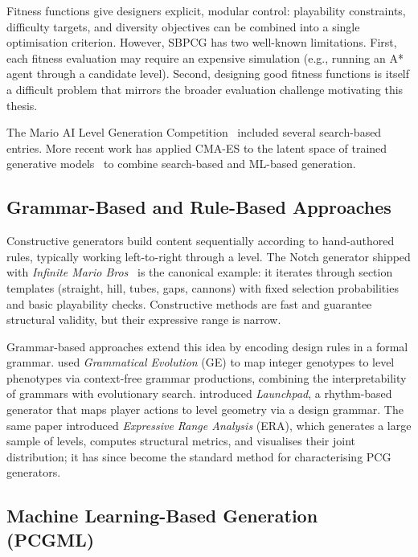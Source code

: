 \documentclass[shortabstract, mgr, english]{iithesis}
\begin{document}
Fitness functions give designers explicit, modular
control: playability constraints, difficulty targets,
and diversity objectives can be combined into a single optimisation criterion. However, SBPCG has
two well-known limitations. First, each fitness evaluation may require an
expensive simulation (e.g., running an A* agent through a candidate level).
Second, designing good fitness functions is itself a difficult problem that
mirrors the broader evaluation challenge motivating this thesis.

The Mario AI Level Generation Competition~\citep{shaker2011mario} included
several search-based entries. More recent work has applied CMA-ES to the latent
space of trained generative models~\citep{volz2018evolving} to combine
search-based and ML-based generation.

\subsection{Grammar-Based and Rule-Based Approaches}
\label{subsec:bg-grammar}

Constructive generators build content sequentially according to hand-authored
rules, typically working left-to-right through a level. The Notch generator
shipped with \emph{Infinite Mario
Bros}~\citep{karakovskiy2012marioai} is the canonical example: it iterates
through section templates (straight, hill, tubes, gaps, cannons) with fixed
selection probabilities and basic playability checks. Constructive methods are
fast and guarantee structural validity, but their expressive range is narrow.

Grammar-based approaches extend this idea by encoding design rules in a formal
grammar. \citet{shaker2012evolving} used \emph{Grammatical Evolution} (GE) to
map integer genotypes to level phenotypes via context-free grammar productions,
combining the interpretability of grammars with evolutionary search.
\citet{smith2010analyzing} introduced \emph{Launchpad}, a rhythm-based
generator that maps player actions to level geometry via a design grammar. The
same paper introduced \emph{Expressive Range Analysis} (ERA), which
generates a large sample of levels, computes structural metrics, and
visualises their joint distribution; it has since become the standard method for
characterising PCG generators.

\subsection{Machine Learning-Based Generation (PCGML)}
\label{subsec:bg-pcgml}
\end{document}
